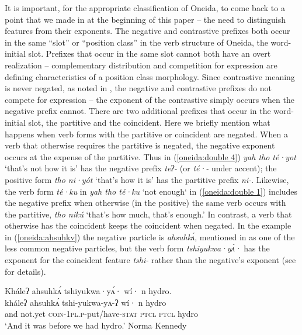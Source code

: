 \documentclass[output=paper,colorlinks,citecolor=brown]{langscibook}
\begin{document}
It is important, for the appropriate classification of Oneida, to come back to a point that we made in  at the beginning of this paper -- the need to distinguish features from their exponents. The negative and contrastive prefixes both occur in the same ``slot'' or ``position class'' in the verb structure of Oneida, the word-initial slot. Prefixes that occur in the same slot cannot both have an overt realization -- complementary distribution and competition for expression are defining characteristics of a position class morphology. Since contrastive meaning is never negated, as noted in , the negative and contrastive prefixes do not compete for expression -- the exponent of the contrastive simply occurs when the negative prefix cannot. There are two additional prefixes that occur in the word-initial slot, the partitive and the coincident. Here we briefly mention what happens when verb forms with the partitive or coincident are negated. When a verb that otherwise requires the partitive is negated, the negative exponent occurs at the expense of the partitive. Thus in (\ref{oneida:double 4}) \textit{yah tho té·yot} `that's not how it is' has the negative prefix \textit{teʔ-} (or \textit{té·-} under accent); the positive form \textit{tho ni·y\'ot} `that's how it is' has the partitive prefix \textit{ni-}. Likewise, the verb form \textit{té·ku}  in \textit{yah tho té·ku} `not enough` in (\ref{oneida:double 1}) includes the negative prefix when otherwise (in the positive) the same verb occurs with the partitive, \textit{tho nikú} `that's how much, that's enough.' In contrast, a verb that otherwise has the coincident keeps the coincident when negated. In the example in (\ref{oneida:ahsuhkv}) the negative particle is \textit{ahsuhkʌ́}, mentioned in  as one of the less common negative particles, but the verb form \textit{tshiyukwa·yʌ́·} has the exponent for the coincident feature \textit{tshi-} rather than the negative's exponent (see \citealt{DiazEtAl2019} for details). 

\ea\label{oneida:ahsuhkv}	
    \glll Kháleʔ ahsuhkʌ́ tshiyukwa·yʌ́· wí· n hydro. \\
    kháleʔ ahsuhkʌ́ tshi-yukwa-yʌ-ʔ wí· n hydro \\
    and {not.yet} \textsc{coin-1pl.p}-put/have-\textsc{stat} \textsc{ptcl} \textsc{ptcl} hydro\\
    \glt `And it was before we had hydro.' Norma Kennedy \citep[73 (5)]{MichelsonEtAl2016}
\z
\end{document}
